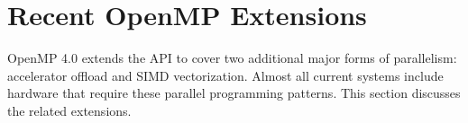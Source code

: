 \section{Recent OpenMP Extensions}
\label{sec:recent_extensions}

OpenMP 4.0 extends the API to cover two additional major forms of
parallelism: accelerator offload and SIMD vectorization. Almost all
current systems include hardware that require these parallel programming 
patterns. This section discusses the related extensions.





